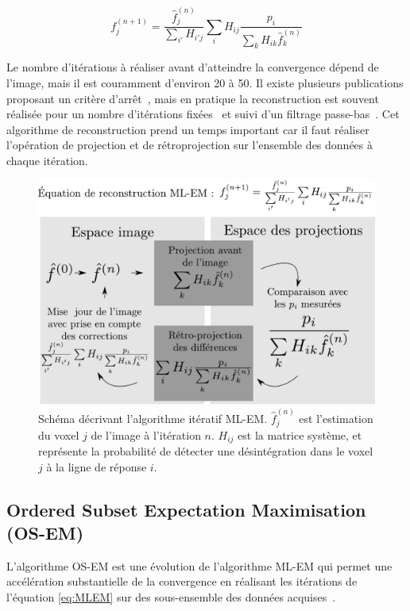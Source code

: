 \begin{equation}
	f_j^{(n+1)}=\frac{\hat{f}_j^{(n)}}{\sum\limits_{i'}H_{i'j}}\sum\limits_{i}H_{ij}\frac{p_i}{\sum\limits_{k}H_{ik}\hat{f}_k^{(n)}}
\label{eq:MLEM}
\end{equation}


Le nombre d'itérations à réaliser avant d'atteindre la convergence dépend de l'image, mais il est couramment d'environ 20 à 50. Il existe plusieurs publications proposant un critère d'arrêt~\cite{bissantz2006multi}, mais en pratique la reconstruction est souvent réalisée pour un nombre d'itérations fixées~\cite{bailey2005positron} et  suivi d'un filtrage passe-bas~\cite{daube2001application}. Cet algorithme de reconstruction prend un temps important car il faut réaliser l'opération de projection et de rétroprojection sur l'ensemble des données à chaque itération.

\begin{figure}
\centering
\includegraphics[width=12cm]{images/MLEM}
\caption[Schéma de principe de l'algorithme MLEM]{Schéma décrivant l'algorithme itératif ML-EM. $\hat{f}^{(n)}_j$ est l'estimation du voxel $j$ de l'image à l'itération $n$. $H_{ij}$ est la matrice système, et représente la probabilité de détecter une désintégration dans le voxel $j$ à la ligne de réponse $i$.}
\label{fig:schemaMLEM}
\end{figure}


	\subsection{Ordered Subset Expectation Maximisation (OS-EM)}

L'algorithme OS-EM est une évolution de l'algorithme ML-EM  qui permet une accélération substantielle de la convergence en réalisant les itérations de l'équation \ref{eq:MLEM} sur des sous-ensemble des données acquises~\cite{hudson1994accelerated}. 

